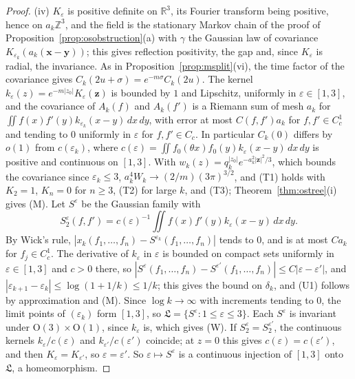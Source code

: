 \documentclass[aps,prd,twocolumn,superscriptaddress,nofootinbib,longbibliography,floatfix,amsmath,amssymb,10pt]{revtex4-2}
\theoremstyle{definition}
\theoremstyle{remark}
\newcommand{\R}{\mathbb{R}}
\newcommand{\Z}{\mathbb{Z}}
\begin{document}
\begin{proof}
(iv) $K_\varepsilon$ is positive definite on $\R^3$, its Fourier
transform being positive, hence on $a_k\Z^3$, and the field is the
stationary Markov chain of the proof of
Proposition~\ref{prop:osobstruction}(a) with $\gamma$ the Gaussian law of
covariance $K_{\varepsilon_k}(a_k(\mathbf x-\mathbf y))$; this gives
reflection positivity, the gap and, since $K_\varepsilon$ is radial, the
invariance. As in Proposition~\ref{prop:msplit}(vi), the time factor of
the covariance gives $C_k(2u+\sigma)=e^{-m\sigma}C_k(2u)$. The kernel
$k_\varepsilon(z)=e^{-m|z_0|}K_\varepsilon(\mathbf z)$ is bounded by $1$
and Lipschitz, uniformly in $\varepsilon\in[1,3]$, and the covariance of
$A_k(f)$ and $A_k(f')$ is a Riemann sum of mesh $a_k$ for $\iint
f(x)f'(y)k_{\varepsilon_k}(x-y)\,dx\,dy$, with error at most $C(f,f')a_k$
for $f,f'\in C^1_c$ and tending to $0$ uniformly in $\varepsilon$ for
$f,f'\in C_c$. In particular $C_k(0)$ differs by $o(1)$ from
$c(\varepsilon_k)$, where $c(\varepsilon)=\iint f_0(\theta x)f_0(y)
k_\varepsilon(x-y)\,dx\,dy$ is positive and continuous on $[1,3]$. With
$w_k(z)=q_k^{|z_0|}e^{-a_k^2|\mathbf z|^2/3}$, which bounds the covariance
since $\varepsilon_k\le3$, $a_k^4W_k\to(2/m)(3\pi)^{3/2}$, and (T1) holds
with $K_2=1$, $K_n=0$ for $n\ge3$, (T2) for large $k$, and (T3);
Theorem~\ref{thm:ostree}(i) gives (M). Let $S^\varepsilon$ be the
Gaussian family with
\[
S^\varepsilon_2(f,f')=c(\varepsilon)^{-1}\iint f(x)f'(y)
k_\varepsilon(x-y)\,dx\,dy .
\]
By Wick's rule, $|x_k(f_1,\dots,f_n)-S^{\varepsilon_k}(f_1,\dots,f_n)|$
tends to $0$, and is at most $Ca_k$ for $f_j\in C^1_c$. The derivative of
$k_\varepsilon$ in $\varepsilon$ is bounded on compact sets uniformly in
$\varepsilon\in[1,3]$ and $c>0$ there, so $|S^\varepsilon(f_1,\dots,f_n)-
S^{\varepsilon'}(f_1,\dots,f_n)|\le C|\varepsilon-\varepsilon'|$, and
$|\varepsilon_{k+1}-\varepsilon_k|\le\log(1+1/k)\le1/k$; this gives the
bound on $\delta_k$, and (U1) follows by approximation and (M). Since $\log
k\to\infty$ with increments tending to $0$, the limit points of
$(\varepsilon_k)$ form $[1,3]$, so $\mathfrak L=\{S^\varepsilon:1\le
\varepsilon\le3\}$. Each $S^\varepsilon$ is invariant under $\mathrm O(3)
\times\mathrm O(1)$, since $k_\varepsilon$ is, which gives (W). If
$S^\varepsilon_2=S^{\varepsilon'}_2$, the continuous kernels
$k_\varepsilon/c(\varepsilon)$ and $k_{\varepsilon'}/c(\varepsilon')$
coincide; at $z=0$ this gives $c(\varepsilon)=c(\varepsilon')$, and then
$K_\varepsilon=K_{\varepsilon'}$, so $\varepsilon=\varepsilon'$. So
$\varepsilon\mapsto S^\varepsilon$ is a continuous injection of $[1,3]$
onto $\mathfrak L$, a homeomorphism.
\end{proof}
\end{document}
